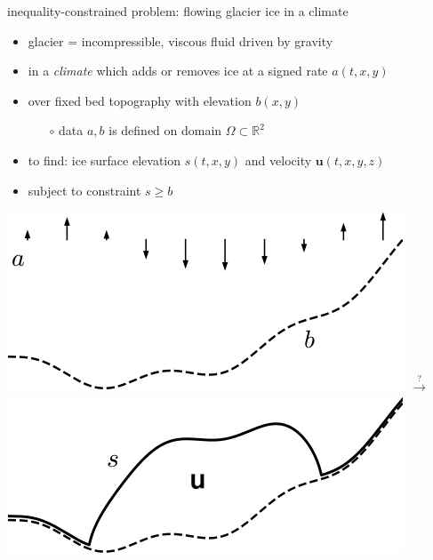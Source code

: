 \documentclass[svgnames,
               hyperref={colorlinks,citecolor=DeepPink4,linkcolor=FireBrick,urlcolor=Maroon},
               usepdftitle=false]  %
               {beamer}
\newcommand{\RR}{\mathbb{R}}
\newcommand{\bu}{\mathbf{u}}
\begin{document}
\begin{frame}{inequality-constrained problem: flowing glacier ice in a climate}

\begin{itemize}
\item glacier = incompressible, viscous fluid driven by gravity
\item in a \emph{climate} which adds or removes ice at a signed rate $a(t,x,y)$
\item over fixed bed topography with elevation $b(x,y)$
    \begin{itemize}
    \item[$\circ$] data $a,b$ is defined on domain $\Omega \subset \RR^2$
    \end{itemize}
\item to find: ice surface elevation $s(t,x,y)$ and velocity $\bu(t,x,y,z)$
\item subject to constraint $\boxed{s\ge b}$
\end{itemize}

\bigskip
\hfill \mbox{\includegraphics[height=0.24\textheight]{../talk-oxford/images/domain-data.png} \quad $\stackrel{?}{\to}$ \quad \includegraphics[height=0.24\textheight]{../talk-oxford/images/domain-velocity.png}}
\end{frame}
\end{document}
